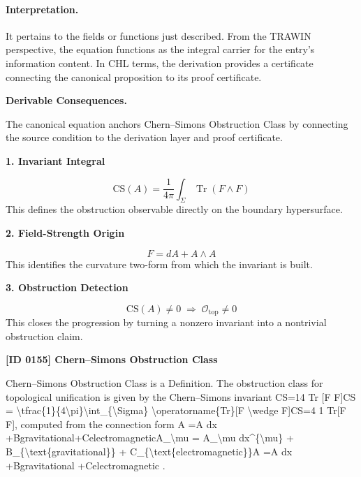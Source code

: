 \paragraph{Interpretation.}
It pertains to the fields or functions just described. From the TRAWIN perspective, the equation functions as the integral carrier for the entry’s information content. In CHL terms, the derivation provides a certificate connecting the canonical proposition to its proof certificate.

\par\vspace{0.35em}
\noindent\textbf{Derivable Consequences.}\quad
\begingroup
\footnotesize
\raggedright
The canonical equation anchors Chern--Simons Obstruction Class by connecting the source condition to the derivation layer and proof certificate.
\par\endgroup

\noindent\textbf{1. Invariant Integral}\par
\[
\mathrm{CS}(A)
=
\frac{1}{4\pi}\int_{\Sigma}\operatorname{Tr}(F\wedge F)
\]
\noindent This defines the obstruction observable directly on the boundary hypersurface.\par
\noindent\textbf{2. Field-Strength Origin}\par
\[
F=dA+A\wedge A
\]
\noindent This identifies the curvature two-form from which the invariant is built.\par
\noindent\textbf{3. Obstruction Detection}\par
\[
\mathrm{CS}(A)\neq 0
\;\Longrightarrow\;
\mathcal{O}_{\mathrm{top}}\neq 0
\]
\noindent This closes the progression by turning a nonzero invariant into a nontrivial obstruction claim.\par

\clearpage
\noindent\textbf{[ID 0155] Chern--Simons Obstruction Class}\par
\vspace{0.35em}
\begingroup\small
{}
Chern--Simons Obstruction Class is a Definition. The obstruction class for topological unification is given by the Chern--Simons invariant CS=14   Tr [F F]CS = \textbackslash{}tfrac\{1\}\{4\textbackslash{}pi\}\textbackslash{}int\_\{\textbackslash{}Sigma\} \textbackslash{}operatorname\{Tr\}[F \textbackslash{}wedge F]CS=4 1    Tr[F F], computed from the connection form A =A dx +Bgravitational+CelectromagneticA\_\textbackslash{}mu = A\_\textbackslash{}mu dx\textasciicircum{}\{\textbackslash{}mu\} + B\_\{\textbackslash{}text\{gravitational\}\} + C\_\{\textbackslash{}text\{electromagnetic\}\}A  =A  dx +Bgravitational +Celectromagnetic .

